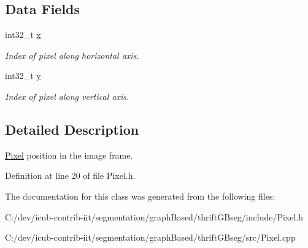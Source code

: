 \subsection*{Data Fields}
\begin{DoxyCompactItemize}
\item 
int32\+\_\+t \hyperlink{classyarp_1_1sig_1_1Pixel_a4d6a5b0c693035c4012aa15e8f8b4b64}{x}\label{classyarp_1_1sig_1_1Pixel_a4d6a5b0c693035c4012aa15e8f8b4b64}

\begin{DoxyCompactList}\small\item\em Index of pixel along horizontal axis. \end{DoxyCompactList}\item 
int32\+\_\+t \hyperlink{classyarp_1_1sig_1_1Pixel_a2ac1d9f1602f323fb9ca9fe62541aeb2}{y}\label{classyarp_1_1sig_1_1Pixel_a2ac1d9f1602f323fb9ca9fe62541aeb2}

\begin{DoxyCompactList}\small\item\em Index of pixel along vertical axis. \end{DoxyCompactList}\end{DoxyCompactItemize}


\subsection{Detailed Description}
\hyperlink{classyarp_1_1sig_1_1Pixel}{Pixel} position in the image frame. 

Definition at line 20 of file Pixel.\+h.



The documentation for this class was generated from the following files\+:\begin{DoxyCompactItemize}
\item 
C\+:/dev/icub-\/contrib-\/iit/segmentation/graph\+Based/thrift\+G\+Bseg/include/Pixel.\+h\item 
C\+:/dev/icub-\/contrib-\/iit/segmentation/graph\+Based/thrift\+G\+Bseg/src/Pixel.\+cpp\end{DoxyCompactItemize}
